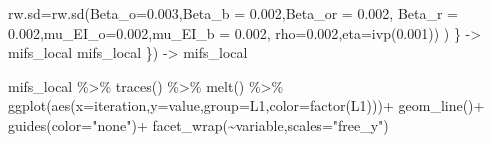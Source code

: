 \documentclass[
]{article}
\newenvironment{Shaded}{\begin{snugshade}}{\end{snugshade}}
\newcommand{\AttributeTok}[1]{\textcolor[rgb]{0.77,0.63,0.00}{#1}}
\newcommand{\FloatTok}[1]{\textcolor[rgb]{0.00,0.00,0.81}{#1}}
\newcommand{\FunctionTok}[1]{\textcolor[rgb]{0.00,0.00,0.00}{#1}}
\newcommand{\NormalTok}[1]{#1}
\newcommand{\OtherTok}[1]{\textcolor[rgb]{0.56,0.35,0.01}{#1}}
\newcommand{\SpecialCharTok}[1]{\textcolor[rgb]{0.00,0.00,0.00}{#1}}
\newcommand{\StringTok}[1]{\textcolor[rgb]{0.31,0.60,0.02}{#1}}
\begin{document}
\begin{Shaded}
\begin{Highlighting}[]
        \AttributeTok{rw.sd=}\FunctionTok{rw.sd}\NormalTok{(}\AttributeTok{Beta\_o=}\FloatTok{0.003}\NormalTok{,}\AttributeTok{Beta\_b =} \FloatTok{0.002}\NormalTok{,}\AttributeTok{Beta\_or =} \FloatTok{0.002}\NormalTok{, }
                    \AttributeTok{Beta\_r =} \FloatTok{0.002}\NormalTok{,}\AttributeTok{mu\_EI\_o=}\FloatTok{0.002}\NormalTok{,}\AttributeTok{mu\_EI\_b =} \FloatTok{0.002}\NormalTok{,}
             \AttributeTok{rho=}\FloatTok{0.002}\NormalTok{,}\AttributeTok{eta=}\FunctionTok{ivp}\NormalTok{(}\FloatTok{0.001}\NormalTok{))}
\NormalTok{      )}
\NormalTok{  \} }\OtherTok{{-}\textgreater{}}\NormalTok{ mifs\_local}
\NormalTok{  mifs\_local}
\NormalTok{\}) }\OtherTok{{-}\textgreater{}}\NormalTok{ mifs\_local}
\end{Highlighting}
\end{Shaded}

\begin{Shaded}
\begin{Highlighting}[]
\NormalTok{mifs\_local }\SpecialCharTok{\%\textgreater{}\%}
  \FunctionTok{traces}\NormalTok{() }\SpecialCharTok{\%\textgreater{}\%}
  \FunctionTok{melt}\NormalTok{() }\SpecialCharTok{\%\textgreater{}\%}
  \FunctionTok{ggplot}\NormalTok{(}\FunctionTok{aes}\NormalTok{(}\AttributeTok{x=}\NormalTok{iteration,}\AttributeTok{y=}\NormalTok{value,}\AttributeTok{group=}\NormalTok{L1,}\AttributeTok{color=}\FunctionTok{factor}\NormalTok{(L1)))}\SpecialCharTok{+}
  \FunctionTok{geom\_line}\NormalTok{()}\SpecialCharTok{+}
  \FunctionTok{guides}\NormalTok{(}\AttributeTok{color=}\StringTok{"none"}\NormalTok{)}\SpecialCharTok{+}
  \FunctionTok{facet\_wrap}\NormalTok{(}\SpecialCharTok{\textasciitilde{}}\NormalTok{variable,}\AttributeTok{scales=}\StringTok{"free\_y"}\NormalTok{)}
\end{Highlighting}
\end{Shaded}
\end{document}

